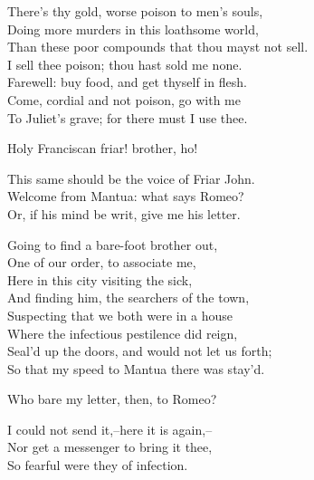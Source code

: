 \begin{speech}
There's thy gold, worse poison to men's souls, \\

Doing more murders in this loathsome world, \\
Than these poor compounds that thou mayst not sell. \\
I sell thee poison; thou hast sold me none. \\
Farewell: buy food, and get thyself in flesh. \\
Come, cordial and not poison, go with me \\
To Juliet's grave; for there must I use thee. 
\\
\end{speech}


 
\begin{speech}
Holy Franciscan friar! brother, ho! 
\\
\end{speech}
\begin{speech}
This same should be the voice of Friar John. \\

Welcome from Mantua: what says Romeo? \\
Or, if his mind be writ, give me his letter. \\
\end{speech}
\begin{speech}
Going to find a bare-foot brother out, \\
One of our order, to associate me, \\
Here in this city visiting the sick, \\
And finding him, the searchers of the town, \\
Suspecting that we both were in a house \\
Where the infectious pestilence did reign, \\
Seal'd up the doors, and would not let us forth; \\
So that my speed to Mantua there was stay'd. \\
\end{speech}
\begin{speech}
Who bare my letter, then, to Romeo? \\
\end{speech}
\begin{speech}
I could not send it,--here it is again,-- \\
Nor get a messenger to bring it thee, \\
So fearful were they of infection. \\
\end{speech}
